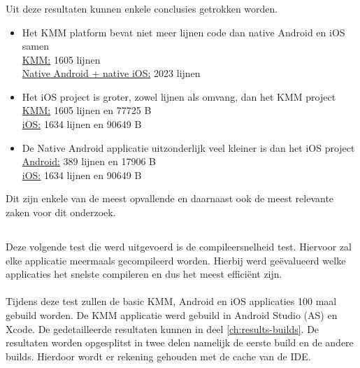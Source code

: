 \subsubsection{}
\label{sec:M-test-lijnen-code-conclusion}
Uit deze resultaten kunnen enkele conclusies getrokken worden.
\begin{itemize}
    \item Het KMM platform bevat niet meer lijnen code dan native Android en iOS samen\\
    \underline{KMM:} 1605 lijnen\\
    \underline{Native Android + native iOS:} 2023 lijnen\\
    \item Het iOS project is groter, zowel lijnen als omvang, dan het KMM project\\
    \underline{KMM:} 1605 lijnen en 77725 B\\
    \underline{iOS:} 1634 lijnen en 90649 B\\
    \item De Native Android applicatie uitzonderlijk veel kleiner is dan het iOS project\\
    \underline{Android:} 389 lijnen en 17906 B\\
    \underline{iOS:} 1634 lijnen en 90649 B
\end{itemize}

Dit zijn enkele van de meest opvallende en daarnaast ook de meest relevante zaken voor dit onderzoek.

\subsection{}
\label{sec:M-test-compileersnelheid}
Deze volgende test die werd uitgevoerd is de compileersnelheid test. Hiervoor zal elke applicatie meermaals gecompileerd worden. Hierbij werd geëvalueerd welke applicaties het snelste compileren en dus het meest efficiënt zijn.
\\ \\
Tijdens deze test zullen de basic KMM, Android en iOS applicaties 100 maal gebuild worden. De KMM applicatie werd gebuild in Android Studio (AS) en Xcode. De gedetailleerde resultaten kunnen in deel \ref{ch:results-builds}. De resultaten worden opgesplitst in twee delen namelijk de eerste build en de andere builds. Hierdoor wordt er rekening gehouden met de cache van de IDE.

